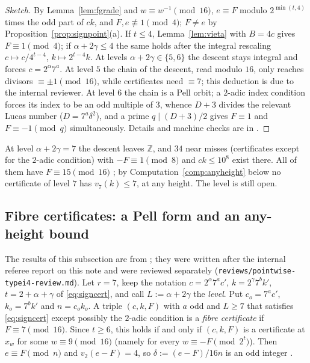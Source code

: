 \documentclass[11pt,reqno]{amsart}
\theoremstyle{definition}
\newcommand{\Z}{\mathbb Z}
\begin{document}
\begin{proof}[Sketch]
By Lemma~\ref{lem:fgrade} and $w\equiv w^{-1}\pmod{16}$, $e\equiv F$
modulo $2^{\min(t,4)}$ times the odd part of $ck$, and $F,e\not\equiv
1\pmod 4$; $F\neq e$ by Proposition~\ref{prop:signpoint}(a).  If $t\le4$,
Lemma~\ref{lem:vieta} with $B=4c$ gives $F\equiv1\pmod4$; if
$\alpha+2\gamma\le4$ the same holds after the integral rescaling
$c\mapsto c/4^{t-4}$, $k\mapsto2^{t-4}k$.  At levels
$\alpha+2\gamma\in\{5,6\}$ the descent stays integral and forces
$c=2^\alpha7^a$.  At level $5$ the chain of the descent, read modulo $16$,
only reaches divisors $\equiv\pm1\pmod{16}$, while certificates need
$\equiv7$; this deduction is due to the internal reviewer.  At level $6$
the chain is a Pell orbit; a $2$-adic index condition forces its index
to be an odd multiple of $3$, whence $D+3$ divides the relevant Lucas
number ($D=7^a\delta^2$), and a prime $q\mid(D+3)/2$ gives
$F\equiv1$ and $F\equiv-1\pmod q$ simultaneously.  Details and
machine checks are in \cite[\S5]{PT3}.
\end{proof}

At level $\alpha+2\gamma=7$ the descent leaves $\Z$, and $34$ near misses
(certificates except for the $2$-adic condition) with $-F\equiv1\pmod8$
and $ck\le10^8$ exist there.  All of them have $F\equiv15\pmod{16}$
\cite[Obs.~1.3]{PT4}; by Computation~\ref{comp:anyheight} below no
certificate of level $7$ has $v_7(k)\le7$, at any height.  The level is
still open.

\subsection{Fibre certificates: a Pell form and an any-height bound}\label{subsec:pell}
The results of this subsection are from \cite{PT4}; they were written
after the internal referee report on this note and were reviewed
separately (\texttt{reviews/pointwise-typei4-review.md}).  Let $r=7$, keep
the notation $c=2^\alpha7^ac'$, $k=2^\gamma7^bk'$, $t=2+\alpha+\gamma$ of
\eqref{eq:signcert}, and call $L:=\alpha+2\gamma$ the \emph{level}.  Put
$c_o=7^ac'$, $k_o=7^bk'$ and $n=c_ok_o$.  A triple $(c,k,F)$ with $a$ odd
and $L\ge7$ that satisfies \eqref{eq:signcert} except possibly the
$2$-adic condition is a \emph{fibre certificate} if $F\equiv7\pmod{16}$.
Since $t\ge6$, this holds if and only if $(c,k,F)$ is a certificate at
$\hat x_w$ for some $w\equiv9\pmod{16}$ (namely for every $w\equiv-F\pmod
{2^t}$).  Then $e\equiv F\pmod n$ and $v_2(e-F)=4$, so
$\delta:=(e-F)/16n$ is an odd integer \cite[Lemma~1.1]{PT4}.
\end{document}
